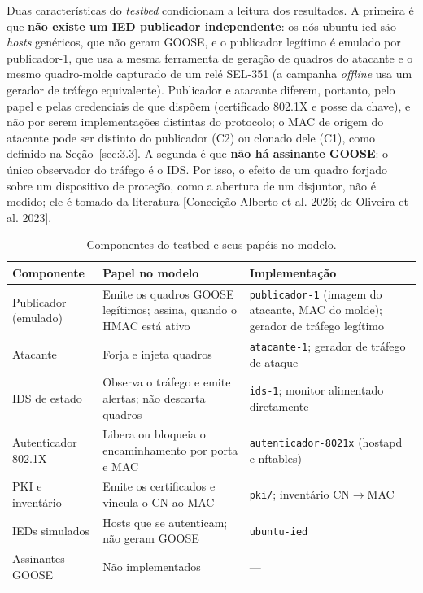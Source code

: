 \documentclass[12pt]{article}
\newcommand{\cit}[2]{[#1]\nocite{#2}}
\begin{document}
Duas características do \emph{testbed} condicionam a leitura dos resultados. A primeira é que \textbf{não existe um IED publicador independente}: os nós ubuntu-ied são \emph{hosts} genéricos, que não geram GOOSE, e o publicador legítimo é emulado por publicador-1, que usa a mesma ferramenta de geração de quadros do atacante e o mesmo quadro-molde capturado de um relé SEL-351 (a campanha \emph{offline} usa um gerador de tráfego equivalente). Publicador e atacante diferem, portanto, pelo papel e pelas credenciais de que dispõem (certificado 802.1X e posse da chave), e não por serem implementações distintas do protocolo; o MAC de origem do atacante pode ser distinto do publicador (C2) ou clonado dele (C1), como definido na Seção~\ref{sec:3.3}. A segunda é que \textbf{não há assinante GOOSE}: o único observador do tráfego é o IDS. Por isso, o efeito de um quadro forjado sobre um dispositivo de proteção, como a abertura de um disjuntor, não é medido; ele é tomado da literatura \cit{Conceição Alberto et al. 2026; de Oliveira et al. 2023}{alberto2026gooseidrs,oliveira2023ataques}.

\begin{table}[!t]
\centering
\caption{Componentes do testbed e seus papéis no modelo.}\label{tab:3}
\footnotesize
\renewcommand{\arraystretch}{1.25}
\begin{tabularx}{\linewidth}{|>{\hsize=0.512\hsize\raggedright\arraybackslash}X|>{\hsize=1.407\hsize\raggedright\arraybackslash}X|>{\hsize=1.081\hsize\raggedright\arraybackslash}X|}
\hline
\textbf{Componente} & \textbf{Papel no modelo} & \textbf{Implementação} \\ \hline
Publicador (emulado) & Emite os quadros GOOSE legítimos; assina, quando o HMAC está ativo & \texttt{publicador{-}1} (imagem do atacante, MAC do molde); gerador de tráfego legítimo \\ \hline
Atacante & Forja e injeta quadros & \texttt{atacante{-}1}; gerador de tráfego de ataque \\ \hline
IDS de estado & Observa o tráfego e emite alertas; não descarta quadros & \texttt{ids{-}1}; monitor alimentado diretamente \\ \hline
Autenticador 802.1X & Libera ou bloqueia o encaminhamento por porta e MAC & \texttt{autenticador{-}8021x} (hostapd e nftables) \\ \hline
PKI e inventário & Emite os certificados e vincula o CN ao MAC & \texttt{pki/\allowbreak{}}; inventário CN\ensuremath{\rightarrow}MAC \\ \hline
IEDs simulados & Hosts que se autenticam; não geram GOOSE & \texttt{ubuntu{-}ied} \\ \hline
Assinantes GOOSE & Não implementados & — \\ \hline
\end{tabularx}
\end{table}
\end{document}
